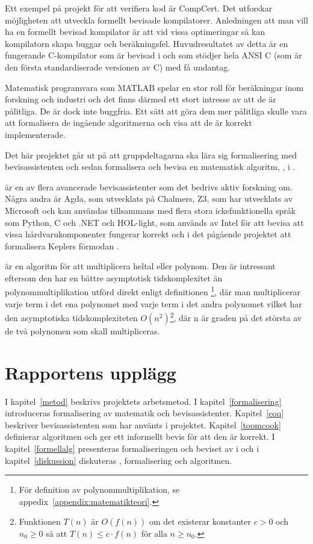 Ett exempel på projekt för att verifiera kod är CompCert. Det utforskar
möjligheten att utveckla formellt bevisade kompilatorer. Anledningen att man
vill ha en formellt bevisad kompilator är att vid vissa optimeringar så kan
kompilatorn skapa buggar och beräkningsfel. Huvudresultatet av detta är en
fungerande C-kompilator som är bevisad i \coq och som stödjer hela ANSI C (som
är den första standardiserade versionen av C) med få
undantag\autocite{compcert}.

Matematisk programvara som MATLAB spelar en stor roll för beräkningar inom
forskning och industri och det finns därmed ett stort intresse av att de är
pålitliga. De är dock inte buggfria. Ett sätt att göra dem mer pålitliga skulle
vara att formalisera de ingående algoritmerna och visa att de är korrekt
implementerade\cite{denes2012refinement}.

Det här projektet går ut på att gruppdeltagarna ska lära sig formalisering med
bevisassistenten \coq och sedan formalisera och bevisa en matematisk algoritm,
\toom, i \coq.

\coq är en av flera avancerade bevisassistenter som det bedrivs aktiv forskning
om. Några andra är Agda, som utvecklats på Chalmers, Z3, som har utvecklats av
Microsoft och kan användas tillsammans med flera stora ickefunktionella språk
som Python, C och .NET och HOL-light, som används av Intel för att bevisa att
vissa hårdvarukomponenter fungerar korrekt och i det pågående projektet att
formalisera Keplers förmodan \cite{hales2008formal}.

\toom är en algoritm för att multiplicera heltal eller polynom. Den är
intressant eftersom den har en bättre asymptotisk tidskomplexitet än
polynommultiplikation utförd direkt enligt definitionen \footnote{För
definition av polynommultiplikation, se
appedix~\ref{appendix:matematikteori}.}, där man multiplicerar varje term i det
ena polynomet med varje term i det andra polynomet vilket har den asymptotiska
tidskomplexiteten $O\left(n^2\right)$\footnote{Funktionen $T(n)$ är $O(f(n))$
om det existerar konstanter $c > 0$ och $n_0 \geq 0$ så att $T(n) \leq c \cdot
f(n)$ för alla $n \geq n_0$.}, där n är graden på det största av de två
polynomen som skall multipliceras.

\section{Rapportens upplägg}
I kapitel~\ref{metod} beskrivs projektets arbetsmetod. I
kapitel~\ref{formalisering} introduceras formalisering av matematik och
bevisassistenter. Kapitel~\ref{coq} beskriver bevisassistenten \coq som har
använts i projektet. Kapitel~\ref{toomcook} definierar algoritmen \toom och ger
ett informellt bevis för att den är korrekt. I kapitel~\ref{formellalg}
presenteras formaliseringen och beviset av \toom i \coq och i
kapitel~\ref{diskussion} diskuteras \coq, formalisering och algoritmen.
